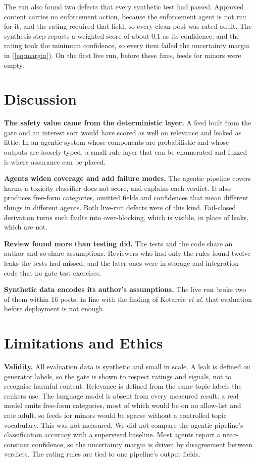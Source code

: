 \documentclass[conference]{IEEEtran}
\begin{document}
The run also found two defects that every synthetic test had passed. Approved content carries no enforcement action, because the enforcement agent is not run for it, and the rating required that field, so every clean post was rated adult. The synthesis step reports a weighted score of about 0.1 as its confidence, and the rating took the minimum confidence, so every item failed the uncertainty margin in (\ref{eq:margin}). On the first live run, before these fixes, feeds for minors were empty.

\section{Discussion}

\textbf{The safety value came from the deterministic layer.} A feed built from the gate and an interest sort would have scored as well on relevance and leaked as little. In an agentic system whose components are probabilistic and whose outputs are loosely typed, a small rule layer that can be enumerated and fuzzed is where assurance can be placed.

\textbf{Agents widen coverage and add failure modes.} The agentic pipeline covers harms a toxicity classifier does not score, and explains each verdict. It also produces free-form categories, omitted fields and confidences that mean different things in different agents. Both live-run defects were of this kind. Fail-closed derivation turns such faults into over-blocking, which is visible, in place of leaks, which are not.

\textbf{Review found more than testing did.} The tests and the code share an author and so share assumptions. Reviewers who had only the rules found twelve leaks the tests had missed, and the later ones were in storage and integration code that no gate test exercises.

\textbf{Synthetic data encodes its author's assumptions.} The live run broke two of them within 16 posts, in line with the finding of Kotarcic \emph{et al.} \cite{kotarcic2022human} that evaluation before deployment is not enough.

\section{Limitations and Ethics}
\label{sec:limits}

\textbf{Validity.} All evaluation data is synthetic and small in scale. A leak is defined on generator labels, so the gate is shown to respect ratings and signals, not to recognise harmful content. Relevance is defined from the same topic labels the rankers use. The language model is absent from every measured result; a real model emits free-form categories, most of which would be on no allow-list and rate adult, so feeds for minors would be sparse without a controlled topic vocabulary. This was not measured. We did not compare the agentic pipeline's classification accuracy with a supervised baseline. Most agents report a near-constant confidence, so the uncertainty margin is driven by disagreement between verdicts. The rating rules are tied to one pipeline's output fields.
\end{document}
